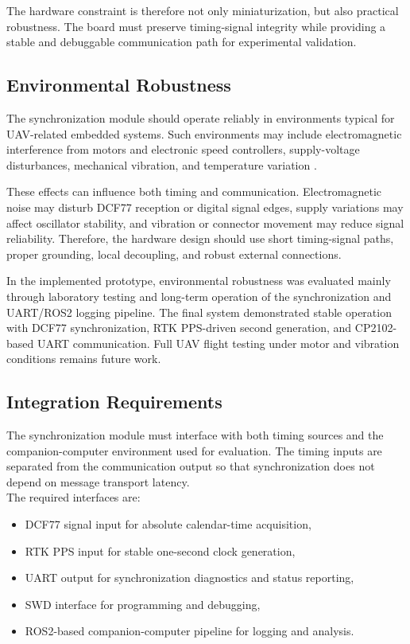 The hardware constraint is therefore not only miniaturization, but also practical robustness. The board must preserve timing-signal integrity while providing a stable and debuggable communication path for experimental validation.

\subsection{Environmental Robustness}

The synchronization module should operate reliably in environments typical for UAV-related embedded systems. Such environments may include electromagnetic interference from motors and electronic speed controllers, supply-voltage disturbances, mechanical vibration, and temperature variation \cite{kopetz2011realtime,allan1966statistics}.

These effects can influence both timing and communication. Electromagnetic noise may disturb DCF77 reception or digital signal edges, supply variations may affect oscillator stability, and vibration or connector movement may reduce signal reliability. Therefore, the hardware design should use short timing-signal paths, proper grounding, local decoupling, and robust external connections.

In the implemented prototype, environmental robustness was evaluated mainly through laboratory testing and long-term operation of the synchronization and UART/ROS2 logging pipeline. The final system demonstrated stable operation with DCF77 synchronization, RTK PPS-driven second generation, and CP2102-based UART communication. Full UAV flight testing under motor and vibration conditions remains future work.

\subsection{Integration Requirements}

The synchronization module must interface with both timing sources and the companion-computer environment used for evaluation. The timing inputs are separated from the communication output so that synchronization does not depend on message transport latency.
\\
The required interfaces are:
\begin{itemize}
    \item DCF77 signal input for absolute calendar-time acquisition,
    \item RTK PPS input for stable one-second clock generation,
    \item UART output for synchronization diagnostics and status reporting,
    \item SWD interface for programming and debugging,
    \item ROS2-based companion-computer pipeline for logging and analysis.
\end{itemize}

